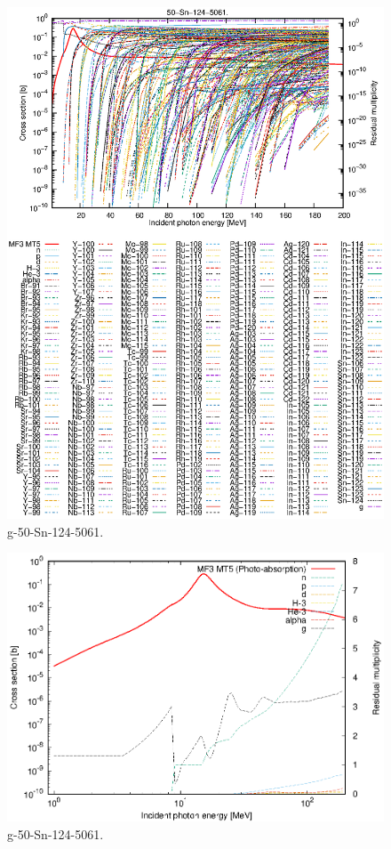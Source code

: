 \begin{figure}
 \includegraphics[width=\linewidth]{eps/g_50-Sn-124_5061.eps}
  \caption{g-50-Sn-124-5061.}
\end{figure}
\newpage \clearpage

\begin{figure}
 \includegraphics[width=\linewidth]{eps-log/g_50-Sn-124_5061.eps}
 \caption{g-50-Sn-124-5061.}
\end{figure}
\newpage \clearpage

